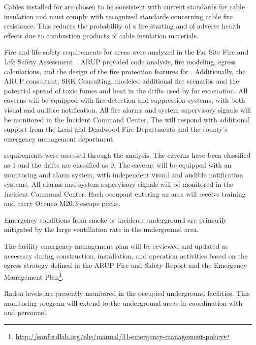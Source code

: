 Cables installed for  are chosen to be
consistent with current \fnal standards for cable insulation and must
comply with recognized standards concerning cable fire resistance. 
This reduces the probability of a fire starting and of adverse health effects due to
combustion products of cable insulation materials.

Fire and life safety requirements for  areas were
analyzed in the  Far Site Fire and Life Safety
  Assessment~. ARUP provided code analysis, fire
modeling, egress calculations, and the design of the fire protection
features for  .  Additionally, the ARUP
consultant, SRK Consulting, modeled additional fire scenarios and the potential
spread of toxic fumes and heat in the drifts used by
 for evacuation.   All caverns will be equipped with
fire detection and suppression systems, with both visual and audible
notification.  All fire alarms and system supervisory signals will be
monitored in the  Incident Command Center.  The
  will respond with additional support from the
Lead and Deadwood Fire Departments and the county’s emergency management
department.

 requirements were assessed through the 
 analysis. The caverns have been classified as  1 and
the drifts are classified as   0.  The caverns will be equipped with
an  monitoring and alarm system, with independent visual and
audible notification systems.  All  alarms and system
supervisory signals will be monitored in the  Incident
Command Center.  Each occupant entering an   area will receive  
training and carry Ocenco M20.3 escape packs.

Emergency conditions from smoke or  incidents underground are
primarily mitigated by the large ventillation rate in the 
underground area.

The facility emergency management plan will be reviewed and updated as
necessary during construction, installation, and operation activities
based on the egress strategy defined in the ARUP Fire and Safety
Report and the   Emergency Management
  Plan\footnote{\url{http://sanfordlab.org/ehs/manual/31-emergency-management-policy}}.

Radon levels are presently monitored in the occupied underground
facilities. This monitoring program will extend to the 
underground areas in coordination with  and 
 personnel.

